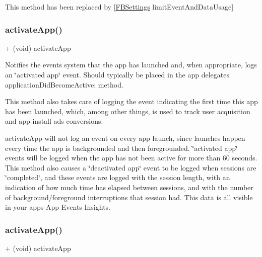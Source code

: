 This method has been replaced by \mbox{[}\hyperlink{interfaceFBSettings}{F\+B\+Settings} limit\+Event\+And\+Data\+Usage\mbox{]} \mbox{\label{interfaceFBAppEvents_a440fe60c1685ab36053ba18a190dd82e}} 
\subsubsection{\texorpdfstring{activate\+App()}{activateApp()}\hspace{0.1cm}{\footnotesize\ttfamily [1/5]}}
{\footnotesize\ttfamily + (void) activate\+App \begin{DoxyParamCaption}{ }\end{DoxyParamCaption}}

Notifies the events system that the app has launched and, when appropriate, logs an \char`\"{}activated app\char`\"{} event. Should typically be placed in the app delegates\textquotesingle{} {\ttfamily application\+Did\+Become\+Active\+:} method.

This method also takes care of logging the event indicating the first time this app has been launched, which, among other things, is used to track user acquisition and app install ads conversions.

{\ttfamily activate\+App} will not log an event on every app launch, since launches happen every time the app is backgrounded and then foregrounded. \char`\"{}activated app\char`\"{} events will be logged when the app has not been active for more than 60 seconds. This method also causes a \char`\"{}deactivated app\char`\"{} event to be logged when sessions are \char`\"{}completed\char`\"{}, and these events are logged with the session length, with an indication of how much time has elapsed between sessions, and with the number of background/foreground interruptions that session had. This data is all visible in your app\textquotesingle{}s App Events Insights. \mbox{\label{interfaceFBAppEvents_a440fe60c1685ab36053ba18a190dd82e}} 
\subsubsection{\texorpdfstring{activate\+App()}{activateApp()}\hspace{0.1cm}{\footnotesize\ttfamily [2/5]}}
{\footnotesize\ttfamily + (void) activate\+App \begin{DoxyParamCaption}{ }\end{DoxyParamCaption}}

